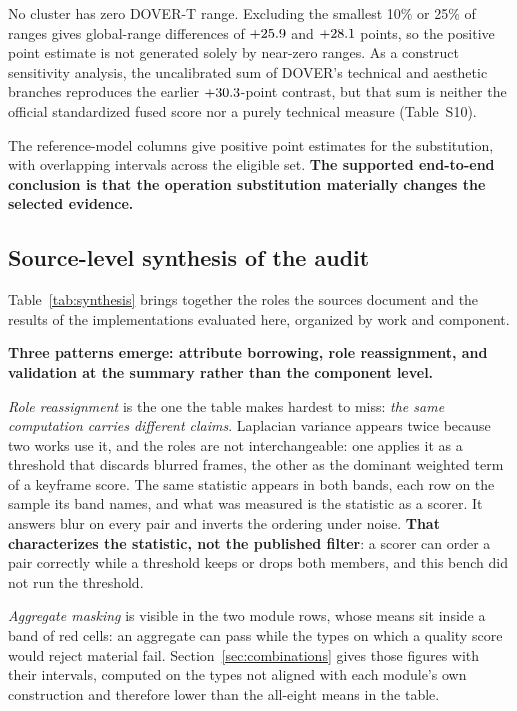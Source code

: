 No cluster has zero DOVER-T range. Excluding the smallest 10\% or 25\% of ranges
gives global-range differences of $+25.9{}$ and $+28.1{}$ points, so the positive
point estimate is not generated solely by near-zero ranges. As a construct
sensitivity analysis, the uncalibrated sum of DOVER's technical and aesthetic
branches reproduces the earlier $+30.3{}$-point contrast, but that sum is neither
the official standardized fused score nor a purely technical measure
(Table~S10).

The reference-model columns give positive point estimates for the substitution, with
overlapping intervals across the eligible set. \textbf{The supported end-to-end conclusion
is that the operation substitution materially changes the selected evidence.}

\subsection{Source-level synthesis of the audit}\label{sec:synthesis}

Table~\ref{tab:synthesis} brings together the roles the sources document and the results of
the implementations evaluated here, organized by work and component.




\textbf{Three patterns emerge: attribute borrowing, role reassignment, and validation at the
summary rather than the component level.}

\emph{Role reassignment} is the one the table makes hardest to miss: \emph{the same
computation carries different claims}. Laplacian variance appears twice because two works use it, and the roles
are not interchangeable: one applies it as a threshold that discards blurred frames, the
other as the dominant weighted term of a keyframe score. The same statistic appears in both bands, each row on the
sample its band names, and what was measured is the statistic as a scorer. It answers blur on every pair and
inverts the ordering under noise. \textbf{That characterizes the statistic, not the published
filter}: a scorer can order a pair correctly while a threshold keeps or drops both members,
and this bench did not run the threshold.

\emph{Aggregate masking} is visible in the two module rows, whose means sit inside a band
of red cells:
an aggregate can pass while the types on which a quality score would reject material fail.
Section~\ref{sec:combinations} gives those figures with their intervals, computed on the
types not aligned with each module's own construction and therefore lower than the
all-eight means in the table.

